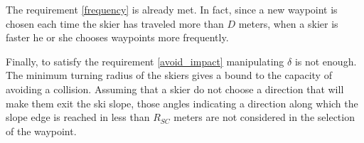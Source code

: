 \documentclass[12pt,a4paper,twoside]{book}
\begin{document}
The requirement \ref{frequency} is already met. In fact, since a new waypoint is chosen each time the skier has traveled more than $D$ meters, when a skier is faster he or she chooses waypoints more frequently.

Finally, to satisfy the requirement \ref{avoid_impact} manipulating $\delta$ is not enough. The minimum turning radius of the skiers gives a bound to the capacity of avoiding a collision. Assuming that a skier do not choose a direction that will make them exit the ski slope, those angles indicating a direction along which the slope edge is reached in less than $R_{SC}$ meters are not considered in the selection of the waypoint.


\end{document}
